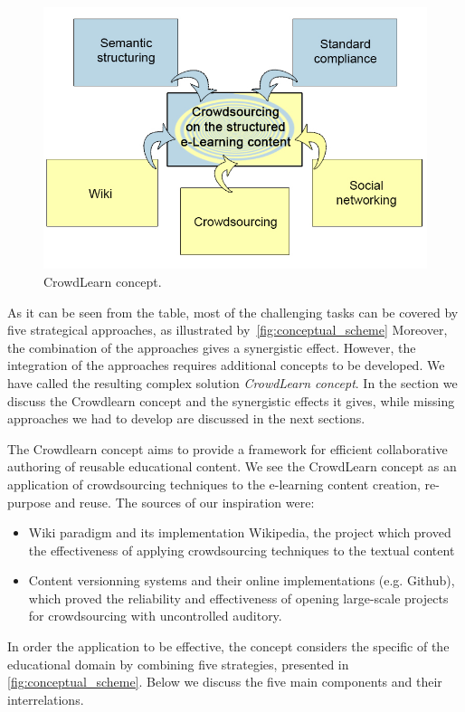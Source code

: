 \documentclass[ngerman,UKenglish,table]{scrbook}
\begin{document}
\begin{figure}[tb]
\centering
	\includegraphics[width=0.75\columnwidth]{images/crowdlearn_updated.jpg}
	\caption{CrowdLearn concept.}
	\label{fig:conceptual_scheme}
\end{figure}

As it can be seen from the table, most of the challenging tasks can be covered by five strategical approaches, as illustrated by~\autoref{fig:conceptual_scheme} 
Moreover, the combination of the approaches gives a synergistic effect.
However, the integration of the approaches requires additional concepts to be developed.
We have called the resulting complex solution \emph{CrowdLearn concept}.
In the section we discuss the Crowdlearn concept and the synergistic effects it gives, while missing approaches we had to develop are discussed in the next sections.

The Crowdlearn concept aims to provide a framework for efficient collaborative authoring of reusable educational content.
We see the CrowdLearn concept as an application of crowdsourcing techniques to the e-learning content creation, re-purpose and reuse.
The sources of our inspiration were:
\begin{itemize}
\item Wiki paradigm and its implementation Wikipedia, the project which proved the effectiveness of applying crowdsourcing techniques to the textual content 
\item Content versionning systems and their online implementations (e.g. Github), which proved the reliability and effectiveness of opening large-scale projects for crowdsourcing with uncontrolled auditory. 
\end{itemize}
In order the application to be effective, the concept considers the specific of the educational domain by combining five strategies, presented in \autoref{fig:conceptual_scheme}.
Below we discuss the five main components and their interrelations.
\end{document}
